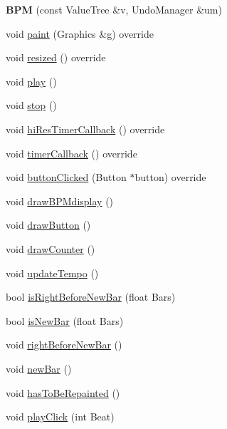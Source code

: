 \begin{DoxyCompactItemize}
\item 
\mbox{\label{class_b_p_m_a244e9aa3954aef1040ad3bcdef628fee}} 
{\bfseries B\+PM} (const Value\+Tree \&v, Undo\+Manager \&um)
\item 
void \mbox{\hyperlink{class_b_p_m_a351beef46e2b82b3b9afccef8eab9550}{paint}} (Graphics \&g) override
\item 
void \mbox{\hyperlink{class_b_p_m_a1065fcee8c76482b4da7327453ccf59a}{resized}} () override
\item 
void \mbox{\hyperlink{class_b_p_m_a837ba2795fae0a7db5bd3e5abbac7a3d}{play}} ()
\item 
void \mbox{\hyperlink{class_b_p_m_ac48f4b87539a26b6139f9718af9bb173}{stop}} ()
\item 
void \mbox{\hyperlink{class_b_p_m_a01df6c7612ab9433bd6fa9f2a954bab4}{hi\+Res\+Timer\+Callback}} () override
\item 
void \mbox{\hyperlink{class_b_p_m_aa7ecb3bca0891551f3c62421eb9fe737}{timer\+Callback}} () override
\item 
void \mbox{\hyperlink{class_b_p_m_a25860f85e579f4d7361f573ddd643146}{button\+Clicked}} (Button $\ast$button) override
\item 
void \mbox{\hyperlink{class_b_p_m_a39680ea9e81f2e18b1e391b3c3b75eb9}{draw\+B\+P\+Mdisplay}} ()
\item 
void \mbox{\hyperlink{class_b_p_m_a9ece3eda2583b29c57ba605bcfd54889}{draw\+Button}} ()
\item 
void \mbox{\hyperlink{class_b_p_m_a35ccc9fc77a337ed4e3b4bbc063d38ca}{draw\+Counter}} ()
\item 
void \mbox{\hyperlink{class_b_p_m_a6970a36d44a2fcee62cd0b995a0fa88b}{update\+Tempo}} ()
\item 
bool \mbox{\hyperlink{class_b_p_m_a541ef2ea993f469bbdcbdb5336353fd0}{is\+Right\+Before\+New\+Bar}} (float Bars)
\item 
bool \mbox{\hyperlink{class_b_p_m_a70d08968386f82cd3005904be36d6083}{is\+New\+Bar}} (float Bars)
\item 
void \mbox{\hyperlink{class_b_p_m_ae33a544e6ed53ab10d48f4dd0d5f2a80}{right\+Before\+New\+Bar}} ()
\item 
void \mbox{\hyperlink{class_b_p_m_aad9cc690db7262344f020276bff96052}{new\+Bar}} ()
\item 
void \mbox{\hyperlink{class_b_p_m_a2745f897d9a943e9d74110a9d856df37}{has\+To\+Be\+Repainted}} ()
\item 
void \mbox{\hyperlink{class_b_p_m_abdf9b80178cc39fe591a653f1fa685ba}{play\+Click}} (int Beat)
\end{DoxyCompactItemize}
